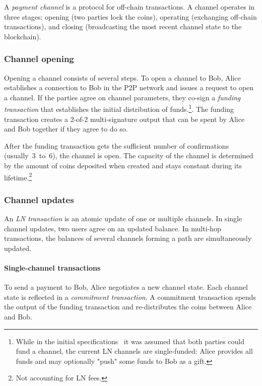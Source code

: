 A \textit{payment channel} is a protocol for off-chain transactions.
A channel operates in three stages: opening (two parties lock the coins), operating (exchanging off-chain transactions), and closing (broadcasting the most recent channel state to the blockchain).


\subsubsection*{Channel opening}

Opening a channel consists of several steps.
To open a channel to Bob, Alice establishes a connection to Bob in the P2P network and issues a request to open a channel.
If the parties agree on channel parameters, they co-sign a \textit{funding transaction} that establishes the initial distribution of funds.\footnote{While in the initial specifications~\cite{Poon2016} it was assumed that both parties could fund a channel, the current LN channels are single-funded: Alice provides all funds and may optionally "push" some funds to Bob as a gift.}.
The funding transaction creates a 2-of-2 multi-signature output that can be spent by Alice and Bob together if they agree to do so.

After the funding transaction gets the sufficient number of confirmations (usually~$3$~to~$6$), the channel is open.
The capacity of the channel is determined by the amount of coins deposited when created and stays constant during its lifetime.\footnote{Not accounting for LN fees.}

\subsubsection*{Channel updates}

An \textit{LN transaction} is an atomic update of one or multiple channels.
In single channel updates, two users agree on an updated balance.
In multi-hop transactions, the balances of several channels forming a path are simultaneously updated.

\paragraph{Single-channel transactions}

To send a payment to Bob, Alice negotiates a new channel state.
Each channel state is reflected in a \textit{commitment transaction}.
A commitment transaction spends the output of the funding transaction and re-distributes the coins between Alice and Bob.

